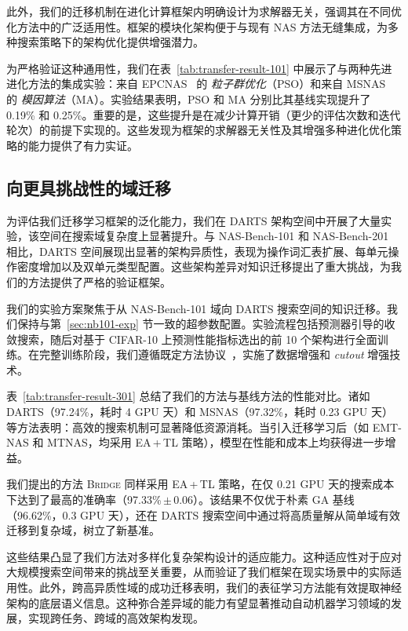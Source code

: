 \documentclass[../main.tex]{subfiles}
\begin{document}
此外，我们的迁移机制在进化计算框架内明确设计为求解器无关，强调其在不同优化方法中的广泛适用性。框架的模块化架构便于与现有 NAS 方法无缝集成，为多种搜索策略下的架构优化提供增强潜力。

为严格验证这种通用性，我们在表~\ref{tab:transfer-result-101} 中展示了与两种先进进化方法的集成实验：来自 EPCNAS~\cite{DBLP:journals/tec/HuangXSZY23} 的 \textit{粒子群优化}（PSO）和来自 MSNAS~\cite{DBLP:journals/tnn/DongHFTTO23} 的 \textit{模因算法}（MA）。实验结果表明，PSO 和 MA 分别比其基线实现提升了 0.19\% 和 0.25\%。重要的是，这些提升是在减少计算开销（更少的评估次数和迭代轮次）的前提下实现的。这些发现为框架的求解器无关性及其增强多种进化优化策略的能力提供了有力实证。

\subsection{向更具挑战性的域迁移}

为评估我们迁移学习框架的泛化能力，我们在 DARTS 架构空间中开展了大量实验，该空间在搜索域复杂度上显著提升。与 NAS-Bench-101 和 NAS-Bench-201 相比，DARTS 空间展现出显著的架构异质性，表现为操作词汇表扩展、每单元操作密度增加以及双单元类型配置。这些架构差异对知识迁移提出了重大挑战，为我们的方法提供了严格的验证框架。

我们的实验方案聚焦于从 NAS-Bench-101 域向 DARTS 搜索空间的知识迁移。我们保持与第~\ref{sec:nb101-exp} 节一致的超参数配置。实验流程包括预测器引导的收敛搜索，随后对基于 CIFAR-10 上预测性能指标选出的前 10 个架构进行全面训练。在完整训练阶段，我们遵循既定方法协议~\cite{DBLP:conf/aaai/RealAHL19,DBLP:conf/cvpr/ZophVSL18,pham_efficient_2018,DBLP:conf/iclr/LiuSY19,DBLP:journals/tnn/DongHFTTO23}，实施了数据增强和 \textit{cutout} 增强技术。

表~\ref{tab:transfer-result-301} 总结了我们的方法与基线方法的性能对比。诸如 DARTS（97.24\%，耗时 4 GPU 天）和 MSNAS（97.32\%，耗时 0.23 GPU 天）等方法表明：高效的搜索机制可显著降低资源消耗。当引入迁移学习后（如 EMT-NAS 和 MTNAS，均采用 EA\,+\,TL 策略），模型在性能和成本上均获得进一步增益。

我们提出的方法 \textsc{Bridge} 同样采用 EA\,+\,TL 策略，在仅 0.21 GPU 天的搜索成本下达到了最高的准确率（97.33\%\,\(\pm\)\,0.06）。该结果不仅优于朴素 GA 基线（96.62\%，0.3 GPU 天），还在 DARTS 搜索空间中通过将高质量解从简单域有效迁移到复杂域，树立了新基准。

这些结果凸显了我们方法对多样化复杂架构设计的适应能力。这种适应性对于应对大规模搜索空间带来的挑战至关重要，从而验证了我们框架在现实场景中的实际适用性。此外，跨高异质性域的成功迁移表明，我们的表征学习方法能有效提取神经架构的底层语义信息。这种弥合差异域的能力有望显著推动自动机器学习领域的发展，实现跨任务、跨域的高效架构发现。
\end{document}
